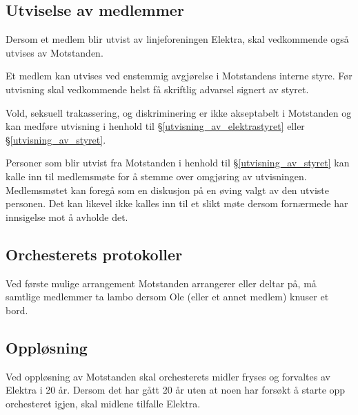 \subsection{Utviselse av medlemmer}
    \begin{statute}[\label{utvisning_av_elektrastyret}]
        Dersom et medlem blir utvist av linjeforeningen Elektra, skal vedkommende også utvises av Motstanden.
    \end{statute}
    \begin{statute}[\label{utvisning_av_styret}]
        Et medlem kan utvises ved enstemmig avgjørelse i Motstandens interne styre. Før utvisning skal vedkommende helst få skriftlig advarsel signert av styret.
    \end{statute}
    \begin{statute}
        Vold, seksuell trakassering, og diskriminering er ikke akseptabelt i Motstanden og kan medføre utvisning i henhold til \S\hspace{3pt}\ref{utvisning_av_elektrastyret} eller  \S\hspace{3pt}\ref{utvisning_av_styret}.
    \end{statute}
    \begin{statute}
        Personer som blir utvist fra Motstanden i henhold til \S\hspace{3pt}\ref{utvisning_av_styret} kan kalle inn til medlemsmøte for å stemme over omgjøring av utvisningen. Medlemsmøtet kan foregå som en diskusjon på en øving valgt av den utviste personen. Det kan likevel ikke kalles inn til et slikt møte dersom fornærmede har innsigelse mot å avholde det.
    \end{statute}

\subsection{Orchesterets protokoller}
    \begin{statute}
        Ved første mulige arrangement Motstanden arrangerer eller deltar på, må samtlige medlemmer ta lambo dersom Ole (eller et annet medlem) knuser et bord.     
    \end{statute}

\subsection{Oppløsning}
    \begin{statute}
        Ved oppløsning av Motstanden skal orchesterets midler fryses og forvaltes av Elektra i 20 år. Dersom det har gått 20 år uten at noen har forsøkt å starte opp orchesteret igjen, skal midlene tilfalle Elektra. 
    \end{statute}